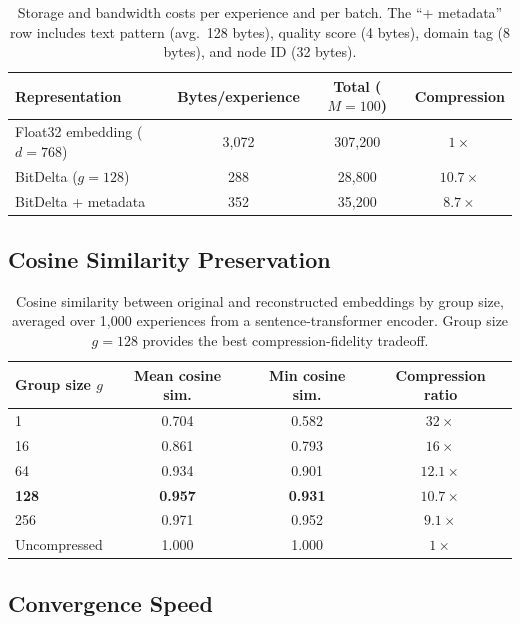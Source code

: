 \documentclass[11pt]{article}
\begin{document}
\begin{table}[H]
\centering
\begin{tabular}{lccc}
\toprule
Representation & Bytes/experience & Total ($M=100$) & Compression \\
\midrule
Float32 embedding ($d=768$) & 3,072 & 307,200 & $1\times$ \\
BitDelta ($g=128$) & 288 & 28,800 & $10.7\times$ \\
BitDelta + metadata & 352 & 35,200 & $8.7\times$ \\
\bottomrule
\end{tabular}
\caption{Storage and bandwidth costs per experience and per batch. The
``+ metadata'' row includes text pattern (avg.\ 128 bytes), quality score
(4 bytes), domain tag (8 bytes), and node ID (32 bytes).}
\label{tab:compression}
\end{table}

\subsection{Cosine Similarity Preservation}

\begin{table}[H]
\centering
\begin{tabular}{lccc}
\toprule
Group size $g$ & Mean cosine sim. & Min cosine sim. & Compression ratio \\
\midrule
1 & 0.704 & 0.582 & $32\times$ \\
16 & 0.861 & 0.793 & $16\times$ \\
64 & 0.934 & 0.901 & $12.1\times$ \\
\textbf{128} & \textbf{0.957} & \textbf{0.931} & $10.7\times$ \\
256 & 0.971 & 0.952 & $9.1\times$ \\
\midrule
Uncompressed & 1.000 & 1.000 & $1\times$ \\
\bottomrule
\end{tabular}
\caption{Cosine similarity between original and reconstructed embeddings by
group size, averaged over 1,000 experiences from a sentence-transformer
encoder. Group size $g=128$ provides the best compression-fidelity tradeoff.}
\label{tab:cosine}
\end{table}

\subsection{Convergence Speed}
\end{document}
